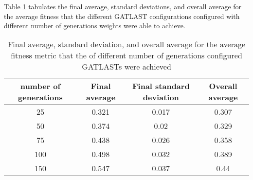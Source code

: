 Table \ref{tab:HP:GA:numGenerations:average fitness} tabulates the final average, standard deviations, and overall average for the average fitness that the different GATLAST configurations configured with different number of generations weights were able to achieve.
\begin{table}[tbh!]
\centering
\begin{adjustbox}{trim=0cm 0cm 0cm 0cm, clip=true}
\begin{tabular}{|c|c|c|c|}
\hline
number of generations & Final average & Final standard deviation & Overall average\\
\hline
25 & 0.321 & 0.017 & 0.307\\\hline
50 & 0.374 & 0.02 & 0.329\\\hline
75 & 0.438 & 0.026 & 0.358\\\hline
100 & 0.498 & 0.032 & 0.389\\\hline
150 & 0.547 & 0.037 & 0.44\\\hline
\end{tabular}
\end{adjustbox}
\caption{Final average, standard deviation, and overall average for the average fitness metric that the of different number of generations configured GATLASTs were achieved}
\label{tab:HP:GA:numGenerations:average fitness}
\end{table}